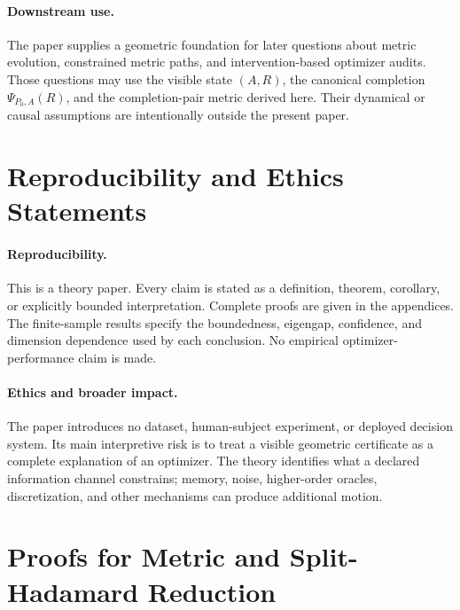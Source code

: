 \documentclass[10pt]{article}
\theoremstyle{plain}
\theoremstyle{definition}
\theoremstyle{remark}
\begin{document}
\paragraph{Downstream use.}
The paper supplies a geometric foundation for later questions about metric
evolution, constrained metric paths, and intervention-based optimizer audits.
Those questions may use the visible state \((A,R)\), the canonical completion
\(\Psi_{P_0,A}(R)\), and the completion-pair metric derived here.  Their
dynamical or causal assumptions are intentionally outside the present paper.

\section{Reproducibility and Ethics Statements}
\label{sec:statements}

\paragraph{Reproducibility.}
This is a theory paper.  Every claim is stated as a definition, theorem,
corollary, or explicitly bounded interpretation.  Complete proofs are given
in the appendices.  The finite-sample results specify the boundedness,
eigengap, confidence, and dimension dependence used by each conclusion.  No
empirical optimizer-performance claim is made.

\paragraph{Ethics and broader impact.}
The paper introduces no dataset, human-subject experiment, or deployed
decision system.  Its main interpretive risk is to treat a visible geometric
certificate as a complete explanation of an optimizer.  The theory identifies
what a declared information channel constrains; memory, noise, higher-order
oracles, discretization, and other mechanisms can produce additional motion.





\appendix
\section{Proofs for Metric and Split-Hadamard Reduction}
\label{app:metric-proofs}
\end{document}

